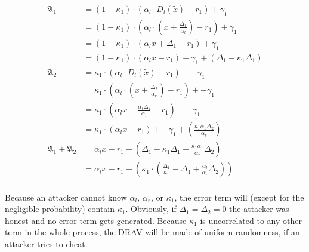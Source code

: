\begin{align*}
%
  \mathfrak{A}_1 &=
  (1 - \kappa_1) \cdot
  (\alpha_l \cdot D_l(\widetilde{x}) - r_1) +
  \gamma_1 \\
  & =
  (1 - \kappa_1) \cdot
  \left(\alpha_l \cdot \left(x + \frac{\Delta_1}{\alpha_l}\right) - r_1\right) +
  \gamma_1 \\
  & =
  (1 - \kappa_1) \cdot
  \left(\alpha_l x + \Delta_1 - r_1\right) +
  \gamma_1 \\
  & =
  (1 - \kappa_1) \cdot
  \left(\alpha_l x - r_1\right) +
  \gamma_1 +
  (\Delta_1 - \kappa_1\Delta_1)\\
  \mathfrak{A}_2 &=
  \kappa_1 \cdot
  (\alpha_l \cdot D_l(\widetilde{x}) - r_1) +
  -\gamma_1 \\
  & =
  \kappa_1 \cdot
  \left(\alpha_l \cdot \left(x + \frac{\Delta_2}{\alpha_r}\right) - r_1\right) +
  -\gamma_1 \\
  & =
  \kappa_1 \cdot
  \left(\alpha_l x + \frac{\alpha_l\Delta_2}{\alpha_r} - r_1\right) +
  -\gamma_1 \\
  & =
  \kappa_1 \cdot
  \left(\alpha_l x - r_1\right) +
  -\gamma_1 +
  \left(\frac{\kappa_1\alpha_1\Delta_2}{\alpha_r}\right)\\
\mathfrak{A}_1 + \mathfrak{A}_2 &=
  \alpha_l x - r_1 +
  \left(
    \Delta_1 - \kappa_1\Delta_1 +
    \frac{\kappa_1\alpha_1}{\alpha_r}\Delta_2
  \right)\\
  &=
  \alpha_l x - r_1 +
  \left(
    \kappa_1 \cdot \left(\frac{\Delta_1}{\kappa_1} - \Delta_1 +
    \frac{\alpha_l}{\alpha_r}\Delta_2\right)
  \right)\\
%
\end{align*}

\noindent{}Because an attacker cannot know $\alpha_l$, $\alpha_r$, or
$\kappa_1$, the error term will (except for the negligible probability) contain
$\kappa_1$. Obviously, if $\Delta_1 = \Delta_2 = 0$ the attacker was honest and
no error term gets generated. Because $\kappa_1$ is uncorrelated to any other
term in the whole process, the DRAV will be made of uniform randomness, if an
attacker tries to cheat.


%
%
\label{sec:drac}

